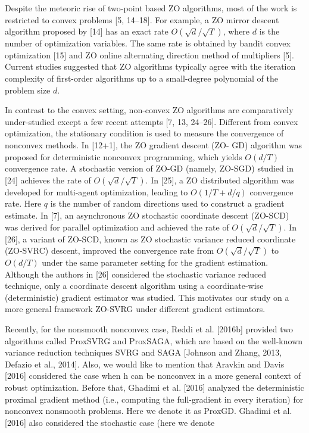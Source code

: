 \documentclass{article}
\theoremstyle{definition}
\theoremstyle{remark}
\begin{document}
{{Despite the meteoric rise of two-point based ZO algorithms, most of the work is restricted to convex problems [5, 14–18]. For example, a ZO mirror descent algorithm proposed by [14] has an exact rate $O(\sqrt{d}/ \sqrt{T})$, where $d$ is the number of optimization variables. The same rate is obtained by bandit convex optimization [15] and ZO online alternating direction method of multipliers [5]. Current studies suggested that ZO algorithms typically agree with the iteration complexity of first-order
algorithms up to a small-degree polynomial of the problem size $d$.

In contrast to the convex setting, non-convex ZO algorithms are comparatively under-studied except
a few recent attempts [7, 13, 24–26]. Different from convex optimization, the stationary condition
is used to measure the convergence of nonconvex methods. In [12+1], the ZO gradient descent (ZO-
GD) algorithm was proposed for deterministic nonconvex programming, which yields $O(d/T)$
convergence rate. A stochastic version of ZO-GD (namely, ZO-SGD) studied in [24] achieves the
rate of $O(\sqrt{d}/\sqrt{T})$. In [25], a ZO distributed algorithm was developed for multi-agent optimization, leading to $O(1/T + d/q)$ convergence rate. Here $q$ is the number of random directions used to construct a gradient estimate. In [7], an asynchronous ZO stochastic coordinate
descent (ZO-SCD) was derived for parallel optimization and achieved the rate of $O(\sqrt{d}/\sqrt{T})$. In [26], a variant of
ZO-SCD, known as ZO stochastic
 variance reduced coordinate (ZO-SVRC) descent, improved the
convergence rate from $O(\sqrt{d}/\sqrt{T})$ to $O(d/T )$ under the same parameter setting for the gradient estimation. Although the authors in [26] considered the stochastic variance reduced technique, only a
coordinate descent algorithm using a coordinate-wise (deterministic) gradient estimator was studied. This motivates our study on a more general framework ZO-SVRG under different gradient estimators.
}
{\color{Violet}
Recently, for the nonsmooth nonconvex case, Reddi et al. [2016b] provided two algorithms called ProxSVRG and ProxSAGA, which are based on the well-known variance reduction techniques SVRG and SAGA [Johnson and Zhang, 2013, Defazio et al., 2014]. Also, we would like to mention that Aravkin and Davis [2016] considered the case when
h can be nonconvex in a more general context of robust optimization. Before that, Ghadimi et al. [2016] analyzed the
deterministic proximal gradient method (i.e., computing the full-gradient in every iteration) for nonconvex nonsmooth
problems. Here we denote it as ProxGD. Ghadimi et al. [2016] also considered the stochastic case (here we denote
}}
\end{document}
